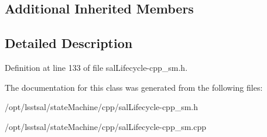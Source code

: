\subsection*{Additional Inherited Members}


\subsection{Detailed Description}


Definition at line 133 of file sal\-Lifecycle-\/cpp\-\_\-sm.\-h.



The documentation for this class was generated from the following files\-:\begin{DoxyCompactItemize}
\item 
/opt/lsstsal/state\-Machine/cpp/sal\-Lifecycle-\/cpp\-\_\-sm.\-h\item 
/opt/lsstsal/state\-Machine/cpp/sal\-Lifecycle-\/cpp\-\_\-sm.\-cpp\end{DoxyCompactItemize}
